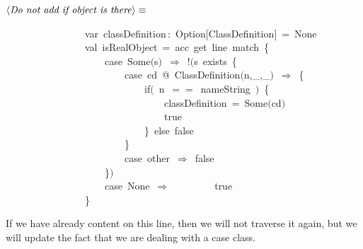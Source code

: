 \documentclass[a4paper,12pt]{article}
\begin{document}
$\left<\mbox{\emph{Do not add if object is there}}\right>\equiv$
\begin{program}~~~~~~~~~~~~~~~~{\vem var}~classDefinition\,{\rm :}~Option$[$ClassDefinition$]$~=~None
\\~~~~~~~~~~~~~~~~{\vem val}~isRealObject~=~acc~get~line~{\vem match}~{\small\{}
\\~~~~~~~~~~~~~~~~~~~~{\vem case}~Some$($s$)$~$\Rightarrow$~!$($s~exists~{\small\{}
\\~~~~~~~~~~~~~~~~~~~~~~~~{\vem case}~cd~@~ClassDefinition$($n,\_,\_$)$~$\Rightarrow$~{\small\{}
\\~~~~~~~~~~~~~~~~~~~~~~~~~~~~{\vem if}$($~n~$==$~nameString~$)$~{\small\{}
\\~~~~~~~~~~~~~~~~~~~~~~~~~~~~~~~~classDefinition~=~Some$($cd$)$
\\~~~~~~~~~~~~~~~~~~~~~~~~~~~~~~~~{\vem true}
\\~~~~~~~~~~~~~~~~~~~~~~~~~~~~{\small\}}~{\vem else}~{\vem false}
\\~~~~~~~~~~~~~~~~~~~~~~~~{\small\}}
\\~~~~~~~~~~~~~~~~~~~~~~~~{\vem case}~other~$\Rightarrow$~{\vem false}
\\~~~~~~~~~~~~~~~~~~~~{\small\}}$)$
\\~~~~~~~~~~~~~~~~~~~~{\vem case}~None~$\Rightarrow$~~~~~~~~~{\vem true}
\\~~~~~~~~~~~~~~~~{\small\}}
\\[0.5em]\end{program}
If we have already content on this line, then we will not traverse it again, but
we will update the fact that we are dealing with a case class.
\end{document}
